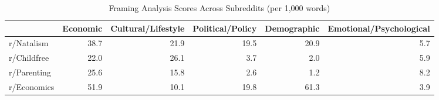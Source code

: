 \begin{table}[h]
    \centering
    \caption{Framing Analysis Scores Across Subreddits (per 1,000 words)}
    \label{tab:framing_scores}
    \begin{tabular}{lrrrrr}
        \toprule
        & Economic & Cultural/Lifestyle & Political/Policy & Demographic & Emotional/Psychological \\
        \midrule
        r/Natalism & 38.7 & 21.9 & 19.5 & 20.9 & 5.7 \\
        r/Childfree & 22.0 & 26.1 & 3.7 & 2.0 & 5.9 \\
        r/Parenting & 25.6 & 15.8 & 2.6 & 1.2 & 8.2 \\
        r/Economics & 51.9 & 10.1 & 19.8 & 61.3 & 3.9 \\
        \bottomrule
    \end{tabular}
\end{table}
